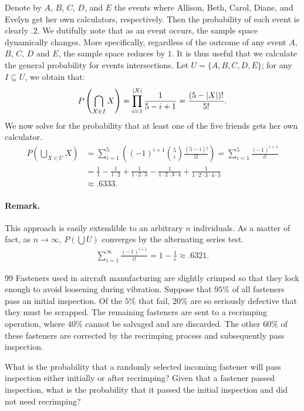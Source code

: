 \documentclass{exam}
\newcommand{\paren}[1]{\left(#1\right)}
\begin{document}
Denote by $A$, $B$, $C$, $D$, and $E$ the events where Allison, Beth, Carol, Diane, and Evelyn get her own calculators, respectively. Then the probability of each event is clearly $.2$. We dutifully note that as an event occurs, the sample space dynamically changes. More specifically, regardless of the outcome of any event $A$, $B$, $C$, $D$ and $E$, the sample space reduces by $1$. It is thus useful that we calculate the general probability for events intersections. Let $U = \{A, B, C, D, E\}$; for any $I \subseteq U$, we obtain that:
\[
	P\paren{\bigcap_{X \in I} X} = \prod_{i = 1}^{\abs{X}}\frac{1}{5 - i + 1} = \frac{(5 - \abs{X})!}{5!}.
\]
We now solve for the probability that at least one of the five friends gets her own calculator.
\begin{align*}
	P\paren{\bigcup_{X \in U} X} &= \sum_{i = 1}^5 \paren{(-1)^{i + 1}\binom5i \frac{(5 - i)!}{5!}} = \sum_{i = 1}^5 \frac{(-1)^{i + 1}}{i!} \\
	&= \frac11 - \frac1{1 \cdot 2} + \frac1{1 \cdot 2 \cdot 3} - \frac1{1 \cdot 2 \cdot 3 \cdot 4} + \frac1{1 \cdot 2 \cdot 3 \cdot 4 \cdot 5} \\
	&\approx .6333.
\end{align*}

\paragraph{Remark.} This approach is easily extendible to an arbitrary $n$ individuals. As a matter of fact, as $n \to \infty$, $P(\bigcup U)$ converges by the alternating series test.
\begin{align*}
	\sum_{i = 1}^\infty \frac{(-1)^{i + 1}}{i!} = 1 - \frac1e \approx .6321.
\end{align*}

\begin{problem}{99}
	Fasteners used in aircraft manufacturing are slightly crimped so that they lock enough to avoid loosening during vibration. Suppose that $95\%$ of all fasteners pass an initial inspection. Of the $5\%$ that fail, $20\%$ are so seriously defective that they must be scrapped. The remaining fasteners are sent to a recrimping operation, where $40\%$ cannot be salvaged and are discarded. The other $60\%$ of these fasteners are corrected by the recrimping process and subsequently pass inspection.
	\begin{tasks}[label=\textbf{\alph*.}]
		\task What is the probability that a randomly selected incoming fastener will pass inspection either initially or after recrimping?
		\task Given that a fastener passed inspection, what is the probability that it passed the initial inspection and did not need recrimping?
	\end{tasks}
\end{problem}
\end{document}
